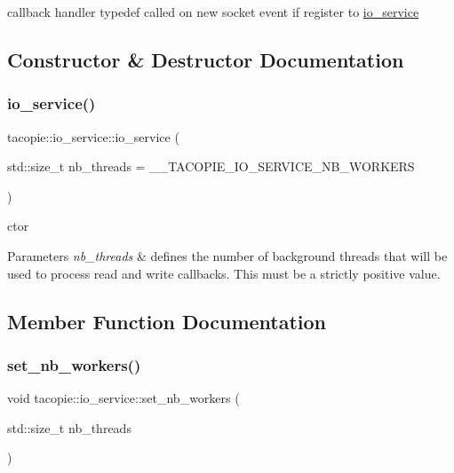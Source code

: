 callback handler typedef called on new socket event if register to \hyperlink{classtacopie_1_1io__service}{io\+\_\+service} 

\subsection{Constructor \& Destructor Documentation}
\mbox{\label{classtacopie_1_1io__service_a62edde9b62571610413d99d075df8102}} 
\subsubsection{\texorpdfstring{io\+\_\+service()}{io\_service()}}
{\footnotesize\ttfamily tacopie\+::io\+\_\+service\+::io\+\_\+service (\begin{DoxyParamCaption}\item[{std\+::size\+\_\+t}]{nb\+\_\+threads = {\ttfamily \+\_\+\+\_\+TACOPIE\+\_\+IO\+\_\+SERVICE\+\_\+NB\+\_\+WORKERS} }\end{DoxyParamCaption})}

ctor


\begin{DoxyParams}{Parameters}
{\em nb\+\_\+threads} & defines the number of background threads that will be used to process read and write callbacks. This must be a strictly positive value. \\
\hline
\end{DoxyParams}


\subsection{Member Function Documentation}
\mbox{\label{classtacopie_1_1io__service_a7e2b0700c0a4591f86c344df8748b3a5}} 
\subsubsection{\texorpdfstring{set\+\_\+nb\+\_\+workers()}{set\_nb\_workers()}}
{\footnotesize\ttfamily void tacopie\+::io\+\_\+service\+::set\+\_\+nb\+\_\+workers (\begin{DoxyParamCaption}\item[{std\+::size\+\_\+t}]{nb\+\_\+threads }\end{DoxyParamCaption})}

